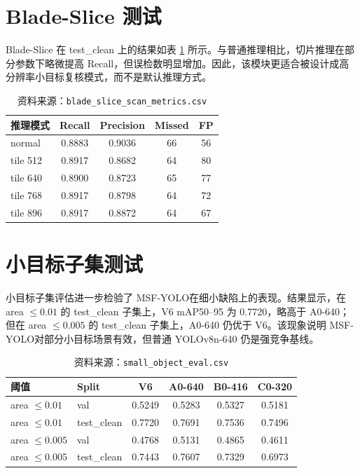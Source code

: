 \documentclass[UTF8,zihao=-4,a4paper]{ctexrep}
\newcommand{\method}{MSF-YOLO}
\newcommand{\code}[1]{\texttt{#1}}
\newcommand{\tablesource}[1]{\vspace{-0.4em}\caption*{\footnotesize 资料来源：#1}}
\begin{document}
\section{Blade-Slice 测试}
Blade-Slice 在 test\_clean 上的结果如表 \ref{tab:blade_slice} 所示。与普通推理相比，切片推理在部分参数下略微提高 Recall，但误检数明显增加。因此，该模块更适合被设计成高分辨率小目标复核模式，而不是默认推理方式。

\begin{table}[H]
  \centering
  \caption{Blade-Slice 在 test\_clean 上的参数扫描结果}
  \label{tab:blade_slice}
  \begin{tabular}{lcccc}
    \toprule
    推理模式 & Recall & Precision & Missed & FP \\
    \midrule
    normal & 0.8883 & 0.9036 & 66 & 56 \\
    tile 512 & 0.8917 & 0.8682 & 64 & 80 \\
    tile 640 & 0.8900 & 0.8723 & 65 & 77 \\
    tile 768 & 0.8917 & 0.8798 & 64 & 72 \\
    tile 896 & 0.8917 & 0.8872 & 64 & 67 \\
    \bottomrule
  \end{tabular}
  \tablesource{\code{blade\_slice\_scan\_metrics.csv}}
\end{table}

\section{小目标子集测试}
小目标子集评估进一步检验了 \method 在细小缺陷上的表现。结果显示，在 area $\le 0.01$ 的 test\_clean 子集上，V6 mAP50--95 为 0.7720，略高于 A0-640；但在 area $\le 0.005$ 的 test\_clean 子集上，A0-640 仍优于 V6。该现象说明 \method 对部分小目标场景有效，但普通 YOLOv8n-640 仍是强竞争基线。

\begin{table}[H]
  \centering
  \caption{小目标子集 mAP50--95 对比}
  \label{tab:small_object}
  \small
  \begin{tabular}{llcccc}
    \toprule
    阈值 & Split & V6 & A0-640 & B0-416 & C0-320 \\
    \midrule
    area $\le 0.01$ & val & 0.5249 & 0.5283 & 0.5327 & 0.5181 \\
    area $\le 0.01$ & test\_clean & 0.7720 & 0.7691 & 0.7536 & 0.7496 \\
    area $\le 0.005$ & val & 0.4768 & 0.5131 & 0.4865 & 0.4611 \\
    area $\le 0.005$ & test\_clean & 0.7443 & 0.7607 & 0.7329 & 0.6973 \\
    \bottomrule
  \end{tabular}
  \tablesource{\code{small\_object\_eval.csv}}
\end{table}
\end{document}
